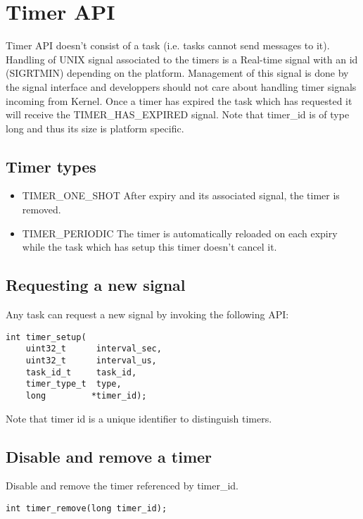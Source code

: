 \documentclass[a4paper,oneside]{report}
\begin{document}
\chapter*{Timer API} 

Timer API doesn't consist of a task (i.e. tasks cannot send messages to it).
Handling of UNIX signal associated to the timers is a Real-time signal with an id (SIGRTMIN)
depending on the platform. Management of this signal is done by the signal interface
and developpers should not care about handling timer signals incoming from Kernel.
Once a timer has expired the task which has requested it will receive the TIMER\_HAS\_EXPIRED
signal.
Note that timer\_id is of type long and thus its size is platform specific.

\section{Timer types}

\begin{itemize}
 \item TIMER\_ONE\_SHOT After expiry and its associated signal, the timer is removed.
 \item TIMER\_PERIODIC The timer is automatically reloaded on each expiry while the task
which has setup this timer doesn't cancel it.
\end{itemize}

\section{Requesting a new signal}
Any task can request a new signal by invoking the following API:
\begin{lstlisting}
int timer_setup(
    uint32_t      interval_sec,
    uint32_t      interval_us,
    task_id_t     task_id,
    timer_type_t  type,
    long         *timer_id);
\end{lstlisting}

Note that timer id is a unique identifier to distinguish timers.

\section{Disable and remove a timer}

Disable and remove the timer referenced by timer\_id.
\begin{lstlisting}
int timer_remove(long timer_id);
\end{lstlisting}
\end{document}
